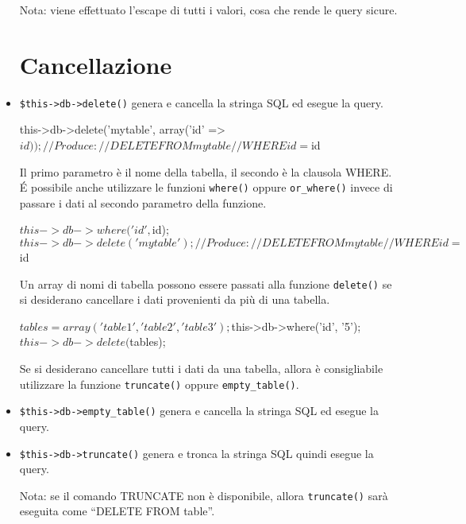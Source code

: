 \begin{itemize}
Nota: viene effettuato l'escape di tutti i valori, cosa che rende le query sicure.

\section*{Cancellazione}
\item \verb|$this->db->delete()| genera e cancella la stringa SQL ed esegue la query.

\begin{code}
this->db->delete('mytable', array('id' => $id)); 

// Produce:
// DELETE FROM mytable 
// WHERE id = $id
\end{code}

Il primo parametro è il nome della tabella, il secondo è la clausola WHERE. \'E possibile anche utilizzare le funzioni \verb|where()| oppure \verb|or_where()| invece di passare i dati al secondo parametro della funzione.

\begin{code}
$this->db->where('id', $id);
$this->db->delete('mytable'); 

// Produce:
// DELETE FROM mytable 
// WHERE id = $id
\end{code}

Un array di nomi di tabella possono essere passati alla funzione \verb|delete()| se si desiderano cancellare i dati provenienti da più di una tabella.

\begin{code}
$tables = array('table1', 'table2', 'table3');
$this->db->where('id', '5');
$this->db->delete($tables);
\end{code}

Se si desiderano cancellare tutti i dati da una tabella, allora è consigliabile utilizzare la funzione \verb|truncate()| oppure \verb|empty_table()|.

\item \verb|$this->db->empty_table()| genera e cancella la stringa SQL ed esegue la query.


\item \verb|$this->db->truncate()| genera e tronca la stringa SQL quindi esegue la query.


Nota: se il comando TRUNCATE non è disponibile, allora \verb|truncate()| sarà eseguita come ``DELETE FROM table''.

\end{itemize}

